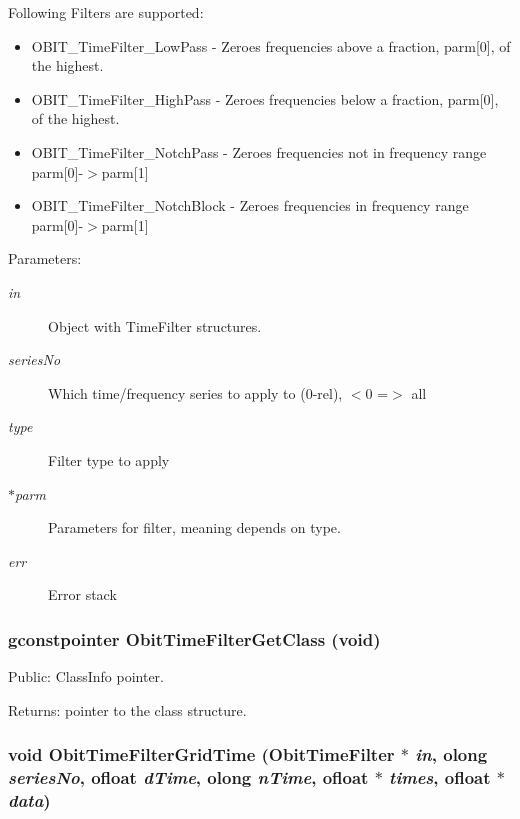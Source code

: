 Following Filters are supported: \begin{itemize}
\item OBIT\_\-Time\-Filter\_\-Low\-Pass - Zeroes frequencies above a fraction, parm[0], of the highest. \item OBIT\_\-Time\-Filter\_\-High\-Pass - Zeroes frequencies below a fraction, parm[0], of the highest. \item OBIT\_\-Time\-Filter\_\-Notch\-Pass - Zeroes frequencies not in frequency range parm[0]-$>$parm[1] \item OBIT\_\-Time\-Filter\_\-Notch\-Block - Zeroes frequencies in frequency range parm[0]-$>$parm[1]\end{itemize}
\begin{Desc}
\item[Parameters:]
\begin{description}
\item[{\em in}]Object with Time\-Filter structures. \item[{\em series\-No}]Which time/frequency series to apply to (0-rel), $<$0 =$>$ all \item[{\em type}]Filter type to apply \item[{\em $\ast$parm}]Parameters for filter, meaning depends on type. \item[{\em err}]Error stack \end{description}
\end{Desc}
\subsubsection{\setlength{\rightskip}{0pt plus 5cm}gconstpointer Obit\-Time\-Filter\-Get\-Class (void)}\label{ObitTimeFilter_8c_a8}


Public: Class\-Info pointer. 

\begin{Desc}
\item[Returns:]pointer to the class structure. \end{Desc}
\subsubsection{\setlength{\rightskip}{0pt plus 5cm}void Obit\-Time\-Filter\-Grid\-Time ({\bf Obit\-Time\-Filter} $\ast$ {\em in}, {\bf olong} {\em series\-No}, {\bf ofloat} {\em d\-Time}, {\bf olong} {\em n\-Time}, {\bf ofloat} $\ast$ {\em times}, {\bf ofloat} $\ast$ {\em data})}\label{ObitTimeFilter_8c_a10}


